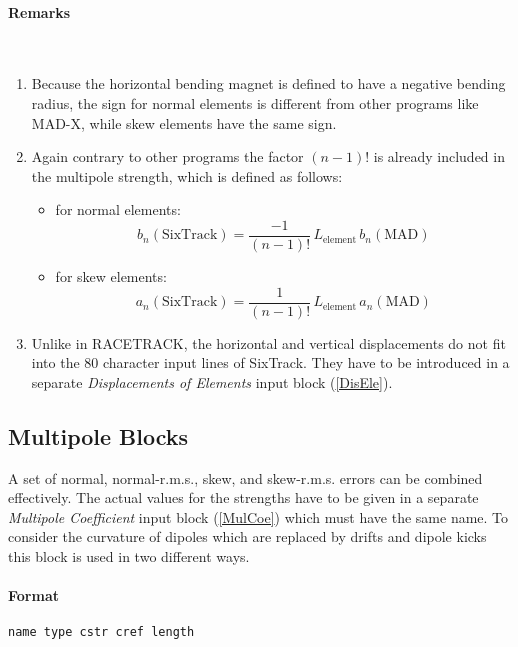 \paragraph{Remarks}~
\begin{enumerate}
    \item Because the horizontal bending magnet is defined to have a negative bending radius, the sign for normal elements is different from other programs like MAD-X, while skew elements have the same sign.
    \item Again contrary to other programs the factor \mbox{$(n-1)$!} is already included in the multipole strength, which is defined as follows:
    \begin{itemize}
        \item for normal elements:
        \begin{equation*}
            b_{n}(\mathrm{SixTrack}) = \frac{-1}{(n-1)!}\,L_{\mathrm{element}}\,b_{n}(\mathrm{MAD})
        \end{equation*}
        \item for skew elements:
        \begin{equation*}
            a_{n}(\mathrm{SixTrack}) = \frac{1}{(n-1)!}\,L_{\mathrm{element}}\,a_{n}(\mathrm{MAD})
        \end{equation*}
    \end{itemize}
    \item Unlike in RACETRACK, the horizontal and vertical displacements do not fit into the 80 character input lines of SixTrack\@. They have to be introduced in a separate \textit{Displacements of Elements} input block (\ref{DisEle}).
\end{enumerate}

\subsection{Multipole Blocks} \label{MulBlo}

A set of normal, normal-r.m.s., skew, and skew-r.m.s. errors can be combined effectively.
The actual values for the strengths have to be given in a separate \textit{Multipole Coefficient} input block (\ref{MulCoe}) which must have the same name.
To consider the curvature of dipoles which are replaced by drifts and dipole kicks this block is used in two different ways.

\paragraph{Format} \texttt{name type cstr cref length}

